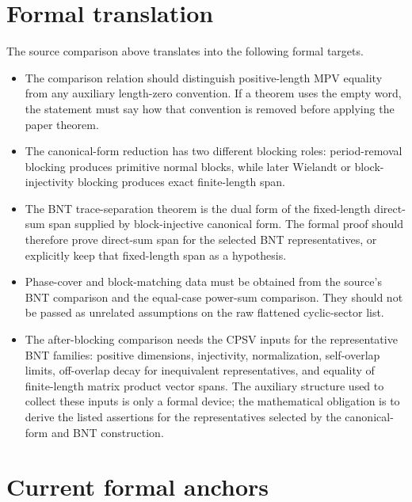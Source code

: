 \documentclass{article}
\begin{document}
\section{Formal translation}

The source comparison above translates into the following formal targets.

\begin{itemize}
  \item The comparison relation should distinguish positive-length MPV equality
  from any auxiliary length-zero convention. If a theorem uses the empty word,
  the statement must say how that convention is removed before applying the
  paper theorem.

  \item The canonical-form reduction has two different blocking roles:
  period-removal blocking produces primitive normal blocks, while later
  Wielandt or block-injectivity blocking produces exact finite-length span.

  \item The BNT trace-separation theorem is the dual form of the fixed-length
  direct-sum span supplied by block-injective canonical form. The formal proof
  should therefore prove direct-sum span for the selected BNT representatives,
  or explicitly keep that fixed-length span as a hypothesis.

  \item Phase-cover and block-matching data must be obtained from the
  source's BNT comparison and the equal-case power-sum comparison. They should not be
  passed as unrelated assumptions on the raw flattened cyclic-sector list.

  \item The after-blocking comparison needs the CPSV inputs for the
  representative BNT families: positive dimensions, injectivity, normalization,
  self-overlap limits, off-overlap decay for inequivalent representatives, and
  equality of finite-length matrix product vector spans. The auxiliary structure
  used to collect these inputs is only a formal device; the mathematical
  obligation is to derive the listed assertions for the representatives selected
  by the canonical-form and BNT construction.
\end{itemize}

\section{Current formal anchors}
\end{document}
